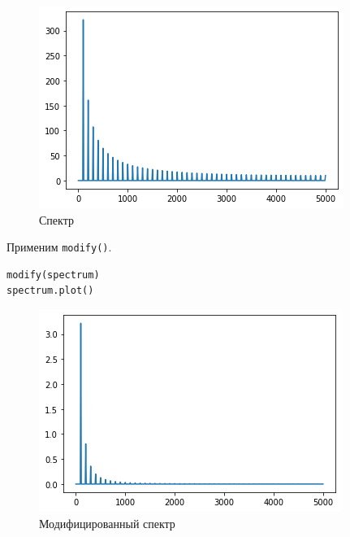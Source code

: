 \documentclass[a4paper,12pt]{report}
\begin{document}
    \begin{figure}[H]
        \centering
        \includegraphics[width=\textwidth]{ex6_first_spectrum.png}
        \caption{Спектр}
        \label{fig:ex6_first_spectrum}
    \end{figure}
    
    Применим \texttt{modify()}.
    
\begin{lstlisting}[language=Python,caption=Снова применяем \texttt{modify()}]
modify(spectrum)
spectrum.plot()
\end{lstlisting}

    \begin{figure}[H]
        \centering
        \includegraphics[width=\textwidth]{ex6_second_spectrum.png}
        \caption{Модифицированный спектр}
        \label{fig:ex6_second_spectrum}
    \end{figure}
    
\end{document}
